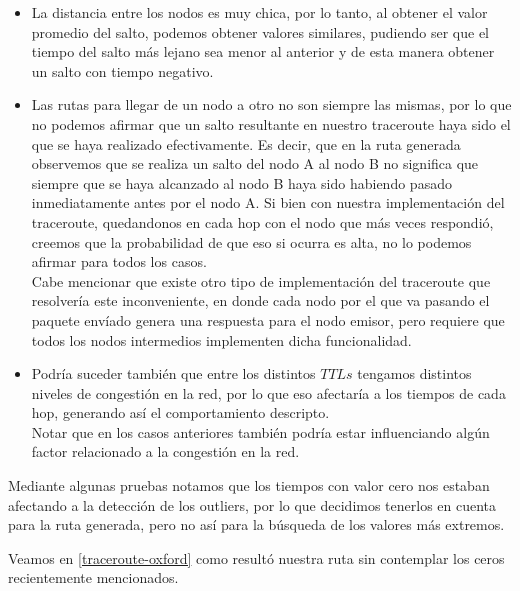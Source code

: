 \begin{itemize}
	\item La distancia entre los nodos es muy chica, por lo tanto, al obtener el valor promedio del salto, podemos obtener valores similares, pudiendo ser que el tiempo del salto más lejano sea menor al anterior y de esta manera obtener un salto con tiempo negativo.
	\item Las rutas para llegar de un nodo a otro no son siempre las mismas, por lo que no podemos afirmar que un salto resultante en nuestro traceroute haya sido el que se haya realizado efectivamente. Es decir, que en la ruta generada observemos que se realiza un salto del nodo A al nodo B no significa que siempre que se haya alcanzado al nodo B haya sido habiendo pasado inmediatamente antes por el nodo A. Si bien con nuestra implementación del traceroute, quedandonos en cada hop con el nodo que más veces respondió, creemos que la probabilidad de que eso si ocurra es alta, no lo podemos afirmar para todos los casos. \\
	Cabe mencionar que existe otro tipo de implementación del traceroute que resolvería este inconveniente, en donde cada nodo por el que va pasando el paquete envíado genera una respuesta para el nodo emisor, pero requiere que todos los nodos intermedios implementen dicha funcionalidad.
	\item Podría suceder también que entre los distintos $TTLs$ tengamos distintos niveles de congestión en la red, por lo que eso afectaría a los tiempos de cada hop, generando así el comportamiento descripto. \\
	Notar que en los casos anteriores también podría estar influenciando algún factor relacionado a la congestión en la red.
\end{itemize}


Mediante algunas pruebas notamos que los tiempos con valor cero nos estaban afectando a la detección de los outliers, por lo que decidimos tenerlos en cuenta para la ruta generada, pero no así para la búsqueda de los valores más extremos.

Veamos en \ref{traceroute-oxford} como resultó nuestra ruta sin contemplar los ceros recientemente mencionados.



